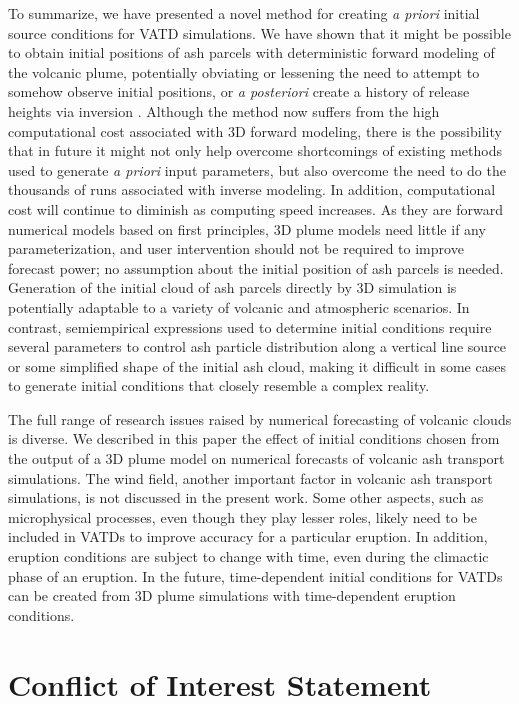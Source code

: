 \documentclass[utf8]{frontiersSCNS} %
\begin{document}
To summarize, we have presented a novel method for creating \textit{a priori} initial source conditions for VATD simulations. We have shown that it might be possible to obtain initial positions of ash parcels with deterministic forward modeling of the volcanic plume, potentially obviating or lessening the need to attempt to somehow observe initial positions, or \textit{a posteriori} create a history of release heights via inversion \citep{stohl2011determination}. Although the method now suffers from the high computational cost associated with 3D forward modeling, there is the possibility that in future it might not only help overcome shortcomings of existing methods used to generate \textit{a priori} input parameters, but also overcome the need to do the thousands of runs associated with inverse modeling. In addition, computational cost will continue to diminish as computing speed increases. As they are forward numerical models based on first principles, 3D plume models need little if any parameterization, and user intervention should not be required to improve forecast power; no assumption about the initial position of ash parcels is needed. Generation of the initial cloud of ash parcels directly by 3D simulation is potentially adaptable to a variety of volcanic and atmospheric scenarios. In contrast, semiempirical expressions used to determine initial conditions require several parameters to control ash particle distribution along a vertical line source or some simplified shape of the initial ash cloud, making it difficult in some cases to generate initial conditions that closely resemble a complex reality.

The full range of research issues raised by numerical forecasting of volcanic clouds is diverse. We described in this paper the effect of initial conditions chosen from the output of a 3D plume model on numerical forecasts of volcanic ash transport simulations. The wind field, another important factor in volcanic ash transport simulations, is not discussed in the present work. Some other aspects, such as microphysical processes, even though they play lesser roles, likely need to be included in VATDs to improve accuracy for a particular eruption. In addition, eruption conditions are subject to change with time, even during the climactic phase of an eruption. In the future, time-dependent initial conditions for VATDs can be created from 3D plume simulations with time-dependent eruption conditions.

\section*{Conflict of Interest Statement}
\end{document}
